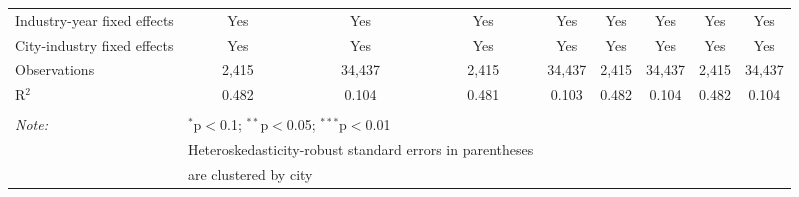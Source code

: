 \documentclass[12pt]{article}
\begin{document}
\begin{table}[!htbp]
\begin{adjustbox}{width=\textwidth, totalheight=\baselineskip,keepaspectratio}
\begin{tabular}{@{\extracolsep{5pt}}lcccccccc}
      Industry-year fixed effects                             & Yes          & Yes           & Yes           & Yes           & Yes           & Yes           & Yes           & Yes           \\
      City-industry fixed effects                             & Yes          & Yes           & Yes           & Yes           & Yes           & Yes           & Yes           & Yes           \\
      Observations                                            & 2,415        & 34,437        & 2,415         & 34,437        & 2,415         & 34,437        & 2,415         & 34,437        \\
      R$^{2}$                                                 & 0.482        & 0.104         & 0.481         & 0.103         & 0.482         & 0.104         & 0.482         & 0.104         \\
      \hline
      \hline \\[-1.8ex]
      \textit{Note:}  & \multicolumn{3}{l}{$^{*}$p$<$0.1; $^{**}$p$<$0.05; $^{***}$p$<$0.01} \\
      & \multicolumn{3}{l}{Heteroskedasticity-robust standard errors in parentheses} \\
      & \multicolumn{3}{l}{are clustered by city} \\
    \end{tabular}
  \end{adjustbox}
\end{table}
\end{document}
